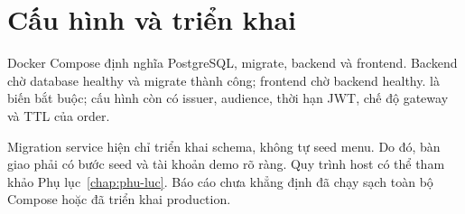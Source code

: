 \section{Cấu hình và triển khai}
Docker Compose định nghĩa PostgreSQL, migrate, backend và frontend.
Backend chờ database healthy và migrate thành công; frontend chờ backend
healthy.  là biến bắt buộc; cấu hình còn có issuer,
audience, thời hạn JWT, chế độ gateway và TTL của order.

Migration service hiện chỉ triển khai schema, không tự seed menu.
Do đó, bàn giao phải có bước seed và tài khoản demo rõ ràng. Quy trình
host có thể tham khảo Phụ lục~\ref{chap:phu-luc}. Báo cáo chưa khẳng
định đã chạy sạch toàn bộ Compose hoặc đã triển khai production.
